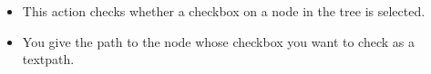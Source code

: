 
\begin{itemize}
\item This action checks whether a checkbox on a node in the tree is selected.
\item You give the path to the node whose checkbox you want to check as a textpath. 
\end{itemize}
